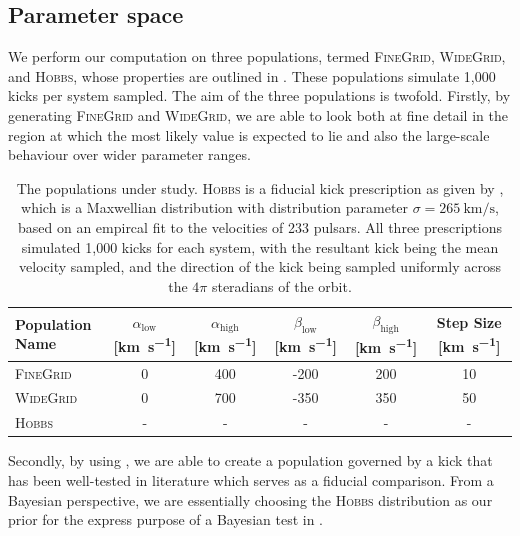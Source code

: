 \subsection{Parameter space}

We perform our computation on three populations, termed \textsc{FineGrid}, \textsc{WideGrid}, and \textsc{Hobbs}, whose properties are outlined in . These populations simulate 1,000 kicks per system sampled. The aim of the three populations is twofold. Firstly, by generating \textsc{FineGrid} and \textsc{WideGrid}, we are able to look both at fine detail in the region at which the most likely value is expected to lie and also the large-scale behaviour over wider parameter ranges.

\begin{table}[h]
    \centering

    \begin{tabular}{l|cc|cc|c}
        \toprule
        \textbf{Population Name} & $\alpha_\text{low}$ [\unit{\km\per\s}] & $\alpha_\text{high}$ [\unit{\km\per\s}] & $\beta_\text{low}$ [\unit{\km\per\s}] & $\beta_\text{high}$ [\unit{\km\per\s}] & Step Size [\unit{\km\per\s}] \\
        \midrule
            \textsc{FineGrid} & 0 & 400 & -200 & 200 & 10 \\
            \textsc{WideGrid} & 0 & 700 & -350 & 350 & 50 \\
            \textsc{Hobbs} & - & - & - & - & - \\
        \bottomrule
    \end{tabular}

    \caption[The populations under study.]{The populations under study. \textsc{Hobbs} is a fiducial kick prescription as given by \citet{Hobbs:2005}, which is a Maxwellian distribution with distribution parameter $\sigma=\SI{265}{\km\per\s}$, based on an empircal fit to the velocities of 233 pulsars. All three prescriptions simulated 1,000 kicks for each system, with the resultant kick being the mean velocity sampled, and the direction of the kick being sampled uniformly across the $4\pi$ steradians of the orbit.}
    \label{tab:populations}
\end{table}

Secondly, by using \citet{Hobbs:2005}, we are able to create a population governed by a kick that has been well-tested in literature \citep[see, for example,][]{Bouffanais:2021, Broekgaarden:2021, Fragione:2021, Igoshev:2021, Mandel:2021} which serves as a fiducial comparison. From a Bayesian perspective, we are essentially choosing the \textsc{Hobbs} distribution as our prior for the express purpose of a Bayesian test in .

